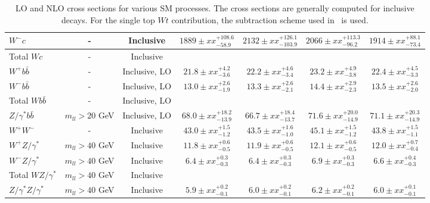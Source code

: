 \begin{table}[hbt]
\begin{center}
{\begin{tabular}{|l|c|c|c|c|c|c|}
$W^- c$ & - & Inclusive & $1889 \pm xx ^{+108.6}_{-58.9}$ & $2132 \pm xx ^{+126.1}_{-103.9}$ & $2066 \pm xx ^{+113.3}_{-96.2}$ & $1914 \pm xx ^{+88.1}_{-73.4}$ \\ \hline
Total $Wc$ & - & Inclusive & & & &  \\ \hline
$W^+ b\bar{b}$ & - & Inclusive, LO & $21.8 \pm xx ^{+4.2}_{-3.6}$ & $22.2 \pm xx ^{+4.6}_{-3.4}$ & $23.2 \pm xx ^{+4.9}_{-3.8}$ & $22.4 \pm xx ^{+4.5}_{-3.3}$ \\ \hline
$W^- b\bar{b}$ & - & Inclusive, LO & $13.0 \pm xx ^{+2.6}_{-1.9}$ & $13.3 \pm xx ^{+2.6}_{-2.1}$ & $14.4 \pm xx ^{+2.9}_{-2.3}$ & $13.5 \pm xx ^{+2.6}_{-2.0}$ \\ \hline
Total $Wb\bar{b}$ & - & Inclusive, LO & & & &  \\ \hline
$Z/\gamma^* b\bar{b}$ & $m_{ll} > 20$ GeV & Inclusive, LO & $68.0 \pm xx ^{+18.2}_{-13.9}$ & $66.7 \pm xx ^{+18.4}_{-13.7}$ & $71.6 \pm xx ^{+20.0}_{-14.9}$ & $71.1 \pm xx ^{+20.3}_{-14.9}$ \\ \hline
$W^+W^-$ & - & Inclusive & $43.0 \pm xx ^{+1.5}_{-1.2}$ & $43.5 \pm xx ^{+1.6}_{-1.0}$ & $45.1 \pm xx ^{+1.5}_{-1.2}$ & $43.8 \pm xx ^{+1.5}_{-1.1}$ \\ \hline
$W^+Z/\gamma^*$ & $m_{ll} > 40$ GeV & Inclusive & $11.8 \pm xx ^{+0.6}_{-0.5}$ & $11.9 \pm xx ^{+0.6}_{-0.5}$ & $12.1 \pm xx ^{+0.6}_{-0.5}$ & $12.0 \pm xx ^{+0.7}_{-0.4}$ \\ \hline
$W^-Z/\gamma^*$ & $m_{ll} > 40$ GeV & Inclusive & $6.4 \pm xx ^{+0.3}_{-0.3}$ & $6.4 \pm xx ^{+0.3}_{-0.3}$ & $6.9 \pm xx ^{+0.3}_{-0.3}$ & $6.6 \pm xx ^{+0.4}_{-0.3}$ \\ \hline
Total $WZ/\gamma^*$ & $m_{ll} > 40$ GeV & Inclusive & & & &  \\ \hline
$Z/\gamma^*Z/\gamma^*$ & $m_{ll} > 40$ GeV & Inclusive & $5.9 \pm xx ^{+0.2}_{-0.1}$ & $6.0 \pm xx ^{+0.2}_{-0.1}$ & $6.2 \pm xx ^{+0.2}_{-0.1}$ & $6.0 \pm xx ^{+0.1}_{-0.1}$ \\ \hline
\end{tabular} }
\caption{LO and NLO cross sections for various SM processes. The cross sections are generally
computed for inclusive decays. For the single top $Wt$ contribution, the subtraction scheme
used in~\cite{Wtsubscheme} is used. \label{tab:nlo1}}
\end{center}
\end{table}
